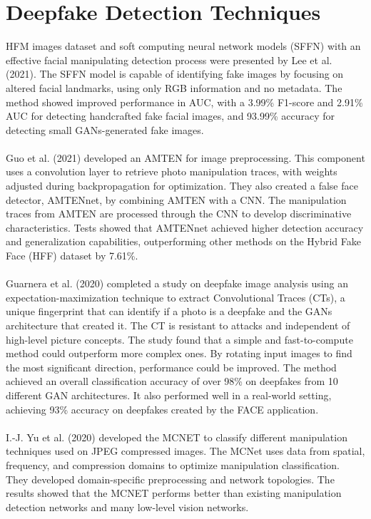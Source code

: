 \section{Deepfake Detection Techniques}
HFM images dataset and soft computing neural network models (SFFN) with an effective facial manipulating detection process were presented by Lee et al. (2021)\cite{lee2021detecting}. The SFFN model is capable of identifying fake images by focusing on altered facial landmarks, using only RGB information and no metadata. The method showed improved performance in AUC, with a 3.99\% F1-score and 2.91\% AUC for detecting handcrafted fake facial images, and 93.99\% accuracy for detecting small GANs-generated fake images. \\\\
Guo et al. (2021)\cite{guo2021fake} developed an AMTEN for image preprocessing. This component uses a convolution layer to retrieve photo manipulation traces, with weights adjusted during backpropagation for optimization. They also created a false face detector, AMTENnet, by combining AMTEN with a CNN. The manipulation traces from AMTEN are processed through the CNN to develop discriminative characteristics. Tests showed that AMTENnet achieved higher detection accuracy and generalization capabilities, outperforming other methods on the Hybrid Fake Face (HFF) dataset\cite{AMTEN} by 7.61\%. \\\\
Guarnera et al. (2020)\cite{guarnera2020fighting} completed a study on deepfake image analysis using an expectation-maximization technique to extract Convolutional Traces (CTs), a unique fingerprint that can identify if a photo is a deepfake and the GANs architecture that created it. The CT is resistant to attacks and independent of high-level picture concepts. The study found that a simple and fast-to-compute method could outperform more complex ones. By rotating input images to find the most significant direction, performance could be improved. The method achieved an overall classification accuracy of over 98\% on deepfakes from 10 different GAN architectures. It also performed well in a real-world setting, achieving 93\% accuracy on deepfakes created by the FACE application. \\\\
I.-J. Yu et al. (2020)\cite{yu2020manipulation} developed the MCNET to classify different manipulation techniques used on JPEG compressed images. The MCNet uses data from spatial, frequency, and compression domains to optimize manipulation classification. They developed domain-specific preprocessing and network topologies. The results showed that the MCNET performs better than existing manipulation detection networks and many low-level vision networks.\\\\
